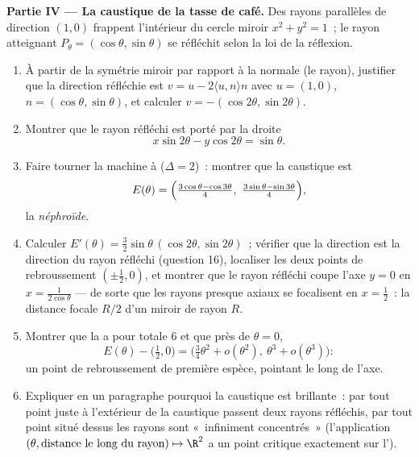 \begin{problem}
\medskip
\noindent\textbf{Partie IV --- La caustique de la tasse de café.}
Des rayons parallèles de direction $(1, 0)$ frappent l'intérieur
du cercle miroir $x^2 + y^2 = 1$~; le rayon atteignant $P_\theta =
(\cos\theta, \sin\theta)$ se réfléchit selon la loi de la
réflexion.
\begin{enumerate}[resume]
  \item À partir de la symétrie miroir par rapport à la normale
        (le rayon),
        justifier que la direction réfléchie est $v = u -
        2\langle u, n\rangle n$ avec $u = (1,0)$, $n =
        (\cos\theta, \sin\theta)$, et calculer $v =
        -(\cos2\theta, \sin2\theta)$.
  \item Montrer que le rayon réfléchi est porté par la droite
        \[
        x\sin 2\theta - y\cos 2\theta = \sin\theta .
        \]
  \item Faire tourner la machine à  ($\Delta = 2$)~:
        montrer que la caustique est
        \[
        E(\theta) = \Bigl(\tfrac{3\cos\theta -
        \cos3\theta}4,\ \tfrac{3\sin\theta -
        \sin3\theta}4\Bigr),
        \]
        la \emph{néphroïde}.
  \item Calculer $E'(\theta) = \tfrac32\sin\theta\,
        (\cos2\theta, \sin2\theta)$~; vérifier que la direction
         est la direction du rayon réfléchi (question
        16), localiser les deux points de rebroussement
        $(\pm\tfrac12, 0)$, et
        montrer que le rayon réfléchi coupe l'axe $y = 0$
        en $x = \frac1{2\cos\theta}$ --- de sorte que les rayons
        presque axiaux se focalisent en $x = \tfrac12$~: la
        distance focale $R/2$ d'un miroir de rayon $R$.
  \item Montrer que la  a pour  totale $6$ et que
        près de $\theta = 0$,
        \[
        E(\theta) - \bigl(\tfrac12, 0\bigr) =
        \bigl(\tfrac34\theta^2 + o(\theta^2),\ \theta^3 +
        o(\theta^3)\bigr) :
        \]
        un point de rebroussement de première espèce, pointant le
        long de l'axe.
  \item Expliquer en un paragraphe pourquoi la caustique est
        brillante~: par tout point juste à l'extérieur de la
        caustique passent deux
        rayons réfléchis, par tout point situé dessus les rayons
        sont «~infiniment concentrés~» (l'application $(\theta,
        \text{distance le long du rayon}) \mapsto \R^2$ a un
        point critique exactement sur l').
\end{enumerate}


\end{problem}
